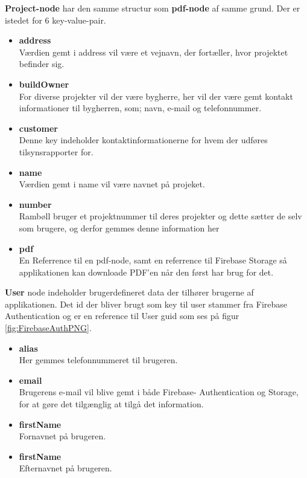 	\textbf{Project-node} har den samme structur som \textbf{pdf-node} af samme grund. Der er istedet for 6 key-value-pair. 
	\begin{itemize}
		\item  \textbf{address}\\
		Værdien gemt i address vil være et vejnavn, der fortæller, hvor projektet befinder sig.\\
		\item  \textbf{buildOwner}\\
		For diverse projekter vil der være bygherre, her vil der være gemt kontakt informationer til bygherren, som; navn, e-mail og telefonnummer. \\ 
		\item  \textbf{customer}\\
		Denne key indeholder kontaktinformationerne for hvem der udføres tilsynsrapporter for.\\
		\item  \textbf{name}\\
		Værdien gemt i name vil være navnet på projeket.\\
		\item  \textbf{number}\\
		Rambøll bruger et projektnummer til deres projekter og dette sætter de selv som brugere, og derfor gemmes denne information her\\
		\item  \textbf{pdf}\\
		En Referrence til en pdf-node, samt en referrence til Firebase Storage så applikationen kan  downloade PDF'en når den først har brug for det.\\
	\end{itemize}

\textbf{User} node indeholder brugerdefineret data der tilhører brugerne af applikationen. Det id der bliver brugt som key til user stammer fra Firebase Authentication og er en reference til User guid som ses på figur \ref{fig:FirebaseAuthPNG}. 
\begin{itemize}
	\item \textbf{alias} \\
	Her gemmes telefonnummeret til brugeren. \\
	\item \textbf{email} \\
	Brugerens e-mail vil blive gemt i både Firebase- Authentication og Storage, for at gøre det tilgænglig at tilgå det information.\\
	\item \textbf{firstName} \\
	Fornavnet på brugeren.\\
	\item \textbf{firstName} \\
	Efternavnet på brugeren.\\

\end{itemize}

\clearpage

